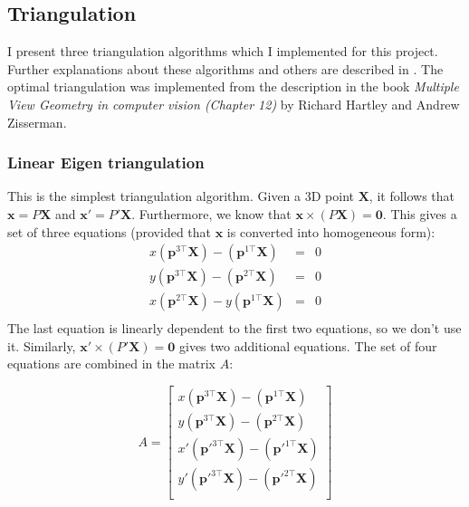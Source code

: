 \documentclass[11pt]{report}
\begin{document}
\subsection{Triangulation}

I present three triangulation algorithms which I implemented for this project. Further explanations about these algorithms and others are described in \cite{tri97}. The optimal triangulation was implemented from the description in the book \textit{Multiple View Geometry in computer vision (Chapter 12)} by Richard Hartley and Andrew Zisserman\cite{Geom}.

\subsubsection{Linear Eigen triangulation}

This is the simplest triangulation algorithm. Given a 3D point $\mathbf{X}$, it follows that $\mathbf{x} = P\mathbf{X}$ and $\mathbf{x}'=P'\mathbf{X}$. Furthermore, we know that $\mathbf{x} \times (P\mathbf{X}) = \mathbf{0}$. This gives a set of three equations (provided that $\textbf{x}$ is converted into homogeneous form):
\[
\left.
  \begin{array}{rcr}
    x(\mathbf{p}^{3\top}\mathbf{X}) - (\mathbf{p}^{1\top}\mathbf{X}) & = & 0\\
    y(\mathbf{p}^{3\top}\mathbf{X}) - (\mathbf{p}^{2\top}\mathbf{X}) & = & 0\\
    x(\mathbf{p}^{2\top}\mathbf{X}) - y(\mathbf{p}^{1\top}\mathbf{X}) & = & 0\\
  \end{array}
\right.
\]
The last equation is linearly dependent to the first two equations, so we don't use it. Similarly, $\mathbf{x}' \times (P'\mathbf{X}) = \mathbf{0}$ gives two additional equations. The set of four equations are combined in the matrix $A$:

\[
A = 
\left [
  \begin{array}{r}
    x(\mathbf{p}^{3\top}\mathbf{X}) - (\mathbf{p}^{1\top}\mathbf{X}) \\
    y(\mathbf{p}^{3\top}\mathbf{X}) - (\mathbf{p}^{2\top}\mathbf{X}) \\
    x'(\mathbf{p}'^{3\top}\mathbf{X}) - (\mathbf{p}'^{1\top}\mathbf{X}) \\
    y'(\mathbf{p}'^{3\top}\mathbf{X}) - (\mathbf{p}'^{2\top}\mathbf{X}) \\
  \end{array}
\right ]
\]
\end{document}
